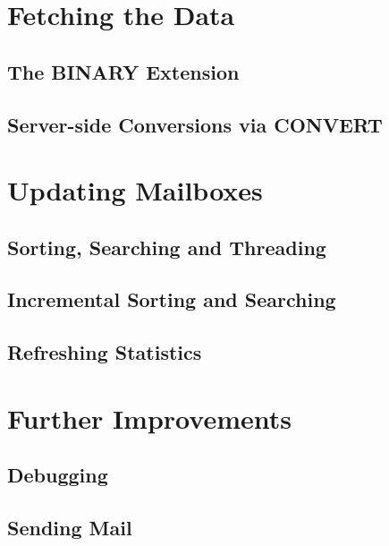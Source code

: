 \documentclass[trojita]{subfiles}
\begin{document}
\cite{rfc5162}

\section{Fetching the Data}

\subsection{The BINARY Extension}

\cite{rfc3516}

\subsection{Server-side Conversions via CONVERT}

\cite{rfc5259}

\section{Updating Mailboxes}

\subsection{Sorting, Searching  and Threading}

\cite{rfc5256}
\cite{rfc5957}

\subsection{Incremental Sorting and Searching}

\cite{rfc5267}

\subsection{Refreshing Statistics}

\cite{rfc5465}

\section{Further Improvements}

\subsection{Debugging}

\subsection{Sending Mail}
\end{document}

